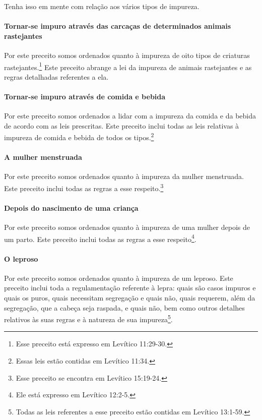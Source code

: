 Tenha isso em mente com relação aos vários tipos de impureza.

\paragraph{Tornar-se impuro através das carcaças de determinados animais rastejantes}

Por este preceito somos ordenados quanto à impureza de oito tipos
de criaturas rastejantes.\footnote{Esse preceito está expresso em Levítico 11:29-30.} Este preceito abrange a
lei da impureza de animais rastejantes e as regras detalhadas referentes
a ela.

\paragraph{Tornar-se impuro através de comida e bebida}

Por este preceito somos ordenados a lidar com a impureza da comida e da
bebida de acordo com as leis prescritas. Este preceito inclui todas as
leis relativas à impureza de comida e bebida de todos os
tipos.\footnote{Essas leis estão contidas em Levítico 11:34.}

\paragraph{A mulher menstruada}

Por este preceito somos ordenados quanto à impureza da mulher
menstruada. Este preceito inclui todas as regras a esse
respeito.\footnote{Esse preceito se encontra em Levítico 15:19-24.}

\paragraph{Depois do nascimento de uma criança}

Por este preceito somos ordenados quanto à impureza de uma mulher
depois de um parto. Este preceito inclui todas as regras a esse
respeito\footnote{Ele está expresso em Levítico 12:2-5.}.

\paragraph{O leproso}

Por este preceito somos ordenados quanto à impureza de um leproso. Este
preceito inclui toda a regulamentação referente à lepra: quais são casos
impuros e quais os puros, quais necessitam segregação e quais não, quais
requerem, além da segregação, que a cabeça seja raspada, e quais não,
bem como outros detalhes relativos às suas regras e à natureza de sua
impureza\footnote{Todas as leis referentes a esse preceito estão contidas em Levítico
  13:1-59.}.



